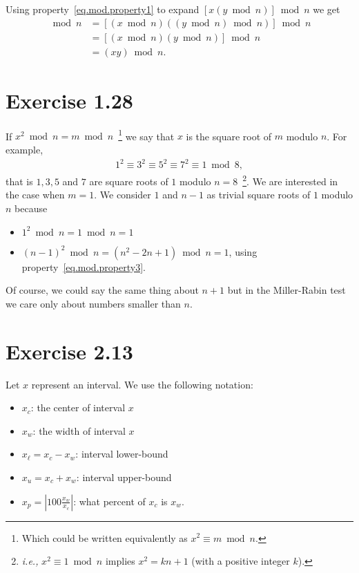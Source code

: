 \documentclass[12pt,a4paper]{article}
\newcommand{\abs}[1]{\left|#1\right|}
\begin{document}
Using property~\eqref{eq.mod.property1} to expand $[x(y\bmod n)]\bmod n$ we get
\begin{align*}
  [x(y\bmod n)]\bmod n
  &= [(x\bmod n)((y\bmod n)\bmod n)]\bmod n \\
  &= [(x\bmod n)(y\bmod n)]\bmod n \\
  &= (xy)\bmod n.
\end{align*}

\section{Exercise 1.28}

If $x^2 \bmod n = m \bmod n$~\footnote{Which could be written equivalently as $x^2
\equiv m \bmod n$.} we say that $x$ is the square root of $m$ modulo $n$. For example,
\begin{align*}
  1^2 \equiv 3^2 \equiv 5^2 \equiv 7^2 \equiv 1 \bmod 8,
\end{align*}
that is $1, 3, 5$ and $7$ are square roots of $1$ modulo $n=8$~\footnote{\emph{i.e.,}
$x^2 \equiv 1 \bmod n$ implies $x^2 = kn + 1$ (with a positive integer $k$).}. We are
interested in the case when $m = 1$. We consider $1$ and $n-1$ as trivial square roots
of $1$ modulo $n$ because
\begin{itemize}
\item $1^2 \bmod n = 1 \bmod n = 1$
\item $(n-1)^2 \bmod n = (n^2 - 2n + 1) \bmod n = 1$, using property~\eqref{eq.mod.property3}.
\end{itemize}
Of course, we could say the same thing about $n+1$ but in the Miller-Rabin test we care
only about numbers smaller than $n$.

\section{Exercise 2.13}

Let $x$ represent an interval. We use the following notation:
\begin{itemize}
\item $x_c$: the center of interval $x$
\item $x_w$: the width of interval $x$
\item $x_{\ell} = x_c - x_w$: interval lower-bound
\item $x_{u} = x_c + x_w$: interval upper-bound
\item $x_p = \abs{100\frac{x_w}{x_c}}$: what percent of $x_c$ is $x_w$.
\end{itemize}
\end{document}
